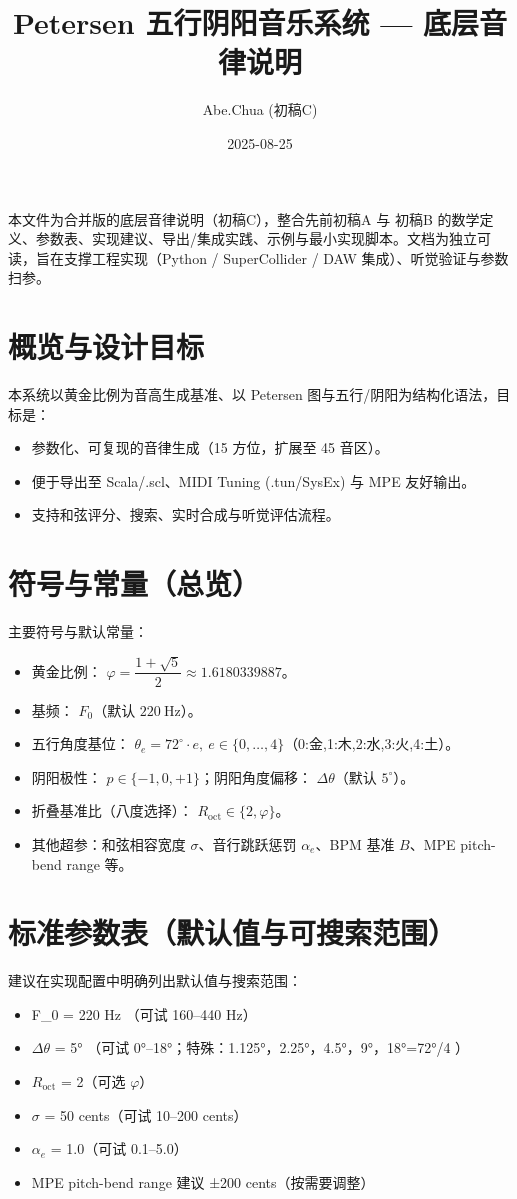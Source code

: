 \documentclass{article}
\title{Petersen 五行阴阳音乐系统 — 底层音律说明}
\author{Abe.Chua (初稿C)}
\date{2025-08-25}
\begin{document}
\maketitle

本文件为合并版的底层音律说明（初稿C），整合先前初稿A 与 初稿B 的数学定义、参数表、实现建议、导出/集成实践、示例与最小实现脚本。文档为独立可读，旨在支撑工程实现（Python / SuperCollider / DAW 集成）、听觉验证与参数扫参。

\section{概览与设计目标}
本系统以黄金比例为音高生成基准、以 Petersen 图与五行/阴阳为结构化语法，目标是：
\begin{itemize}
  \item 参数化、可复现的音律生成（15 方位，扩展至 45 音区）。
  \item 便于导出至 Scala/.scl、MIDI Tuning (.tun/SysEx) 与 MPE 友好输出。
  \item 支持和弦评分、搜索、实时合成与听觉评估流程。
\end{itemize}

\section{符号与常量（总览）}
主要符号与默认常量：
\begin{itemize}
  \item 黄金比例： $\varphi=\dfrac{1+\sqrt{5}}{2}\approx1.6180339887$。
  \item 基频： $F_0$（默认 $220\ \mathrm{Hz}$）。
  \item 五行角度基位： $\theta_e=72^\circ\cdot e,\ e\in\{0,\dots,4\}$（0:金,1:木,2:水,3:火,4:土）。
  \item 阴阳极性： $p\in\{-1,0,+1\}$；阴阳角度偏移： $\Delta\theta$（默认 $5^\circ$）。
  \item 折叠基准比（八度选择）： $R_{\mathrm{oct}}\in\{2,\varphi\}$。
  \item 其他超参：和弦相容宽度 $\sigma$、音行跳跃惩罚 $\alpha_e$、BPM 基准 $B$、MPE pitch-bend range 等。
\end{itemize}

\section{标准参数表（默认值与可搜索范围）}
建议在实现配置中明确列出默认值与搜索范围：
\begin{itemize}
  \item F\_0 = 220 Hz （可试 160–440 Hz）
  \item $\Delta\theta$ = 5° （可试 0°–18°；特殊：1.125°，2.25°，4.5°，9°，18°=72°/4 ）
  \item $R_{\mathrm{oct}}$ = 2（可选 $\varphi$）
  \item $\sigma$ = 50 cents（可试 10–200 cents）
  \item $\alpha_e$ = 1.0（可试 0.1–5.0）
  \item MPE pitch-bend range 建议 ±200 cents（按需要调整）
\end{itemize}
\end{document}
